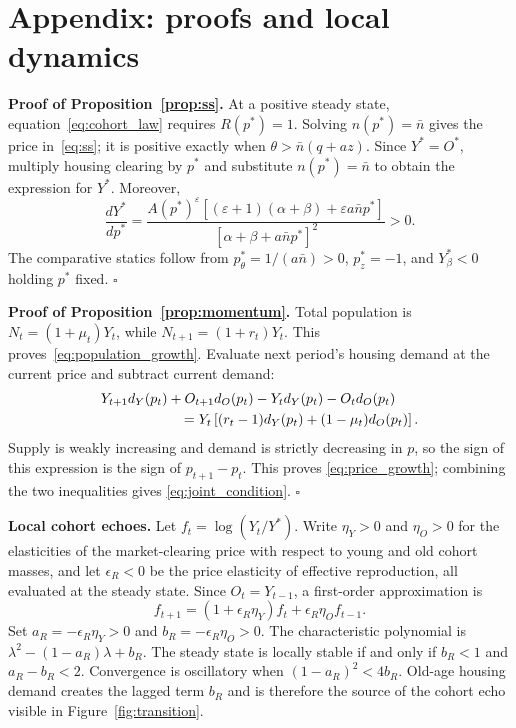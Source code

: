 \documentclass[11pt]{article}
\newcommand{\dY}{d_Y}
\newcommand{\dO}{d_O}
\begin{document}
\appendix
\section*{Appendix: proofs and local dynamics}

\textbf{Proof of Proposition~\ref{prop:ss}.}
At a positive steady state, equation~\eqref{eq:cohort_law} requires
$R(p^*)=1$. Solving $n(p^*)=\bar n$ gives the price in~\eqref{eq:ss}; it is
positive exactly when $\theta>\bar n(q+az)$. Since $Y^*=O^*$, multiply housing
clearing by $p^*$ and substitute $n(p^*)=\bar n$ to obtain the expression for
$Y^*$. Moreover,
\begin{equation}
 \frac{dY^*}{dp^*}
 =\frac{A(p^*)^\varepsilon
 \left[(\varepsilon+1)(\alpha+\beta)
 +\varepsilon a\bar n p^*\right]}
 {\left[\alpha+\beta+a\bar n p^*\right]^2}>0.
\end{equation}
The comparative statics follow from $p^*_{\theta}=1/(a\bar n)>0$,
$p^*_{z}=-1$, and $Y^*_{\beta}<0$ holding $p^*$ fixed. \hfill$\square$

\textbf{Proof of Proposition~\ref{prop:momentum}.}
Total population is $N_t=(1+\mu_t)Y_t$, while
$N_{t+1}=(1+r_t)Y_t$. This proves~\eqref{eq:population_growth}. Evaluate next
period's housing demand at the current price and subtract current demand:
\begin{align}
 &Y_{t+1}\dY(p_t)+O_{t+1}\dO(p_t)
 -Y_t\dY(p_t)-O_t\dO(p_t) \notag\\
 &\hspace{2cm}=Y_t\left[(r_t-1)\dY(p_t)
 +(1-\mu_t)\dO(p_t)\right].
\end{align}
Supply is weakly increasing and demand is strictly decreasing in $p$, so the
sign of this expression is the sign of $p_{t+1}-p_t$. This proves
\eqref{eq:price_growth}; combining the two inequalities gives
\eqref{eq:joint_condition}. \hfill$\square$

\textbf{Local cohort echoes.}
Let $f_t=\log(Y_t/Y^*)$. Write $\eta_Y>0$ and $\eta_O>0$ for the elasticities of
the market-clearing price with respect to young and old cohort masses, and let
$\epsilon_R<0$ be the price elasticity of effective reproduction, all evaluated
at the steady state. Since $O_t=Y_{t-1}$, a first-order approximation is
\begin{equation}
 f_{t+1}=(1+\epsilon_R\eta_Y)f_t
 +\epsilon_R\eta_O f_{t-1}.
 \label{eq:local_law}
\end{equation}
Set $a_R=-\epsilon_R\eta_Y>0$ and $b_R=-\epsilon_R\eta_O>0$. The characteristic
polynomial is $\lambda^2-(1-a_R)\lambda+b_R$. The steady state is locally stable
if and only if $b_R<1$ and $a_R-b_R<2$. Convergence is oscillatory when
$(1-a_R)^2<4b_R$. Old-age housing demand creates the lagged term $b_R$ and is
therefore the source of the cohort echo visible in Figure~\ref{fig:transition}.
\end{document}
